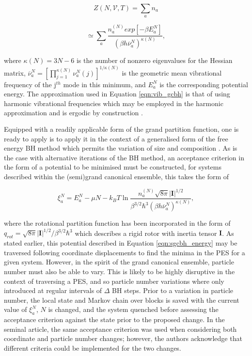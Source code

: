 \begin{equation*}
    Z\left( N,\mathcal{V}, T\right) = \sum_{a} n_{a}
\end{equation*}

\begin{equation}
   \simeq \sum_{a} \frac{ n_{a}^{(N)} exp\left[ -\beta E_{a}^{N} \right] } { \left( \beta h \overline{\nu}_{a}^{N} \right)^{\kappa(N)} },
   \label{eqn:vib_gcbh}
\end{equation}

where $\kappa(N) = 3N-6$ is the number of nonzero eigenvalues for the Hessian matrix, $\overline{\nu}_{a}^{N} = \left[ \prod_{j=1}^{\kappa(N)}\nu_{a}^{N}(j) \right]^{1/\kappa(N)}$ is the geometric mean vibrational frequency of the j$^{th}$ mode in this minimum, and $E_{a}^{N}$ is the corresponding potential energy. The approximation used in Equation \ref{eqn:vib_gcbh} is that of using harmonic vibrational frequencies which may be employed in the harmonic approximation and is ergodic by construction \cite{doi:10.1021/acs.jctc.5b00962}.

Equipped with a readily applicable form of the grand partition function, one is ready to apply is to apply it in the context of a generalised form of the free energy BH method which permits the variation of size and composition \cite{SUTHERLANDCASH20151}. As is the case with alternative iterations of the BH method, an acceptance criterion in the form of a potential to be minimised must be constructed, for systems described within the (semi)grand canonical ensemble, this takes the form of 

\begin{equation}
    \xi_{a}^{N} = E_{a}^{N} - \mu N - k_{B}T\ln{ \frac{ n_{a}^{(N)}\sqrt{8\pi}|\textbf{I}|^{1/2} } { \beta^{3/2}\hbar^{3}\left( \beta h \overline{\nu}_{a}^{N} \right)^{\kappa(N)} } },
    \label{eqn:sgcbh_energy}
\end{equation}

where the rotational partition function has been incorporated in the form of $q_{rot} = \sqrt{8\pi}|\textbf{I}|^{1/2} / \beta^{3/2} \hbar^{3} $ which describes a rigid rotor with inertia tensor $\textbf{I}$. As stated earlier, this potential described in Equation \ref{eqn:sgcbh_energy} may be traversed following coordinate displacements to find the minima in the PES for a given system. However, in the spirit of the grand canonical ensemble, particle number must also be able to vary. This is likely to be highly disruptive in the context of traversing a PES, and so particle number variations where only introduced at regular intervals of $\Delta$ BH steps. Prior to a variation in particle number, the local state and Markov chain over blocks is saved with the current value of $\xi_{a}^{N}$, $N$ is changed, and the system quenched before assessing the acceptance criterion against the state prior to the proposed change. In the seminal article, the same acceptance criterion was used when considering both coordinate and particle number changes; however, the authors acknowledge that different criteria could be implemented for the two changes. 

